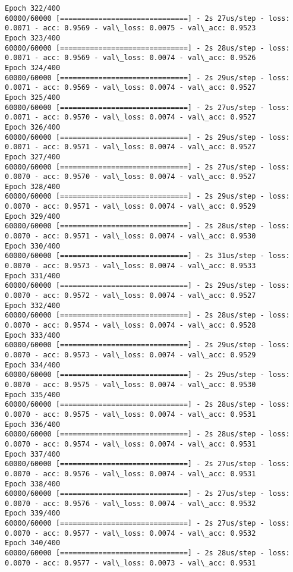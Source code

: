 \documentclass[11pt]{article}
\begin{document}
\begin{Verbatim}[commandchars=\\\{\}]
Epoch 322/400
60000/60000 [==============================] - 2s 27us/step - loss: 0.0071 - acc: 0.9569 - val\_loss: 0.0075 - val\_acc: 0.9523
Epoch 323/400
60000/60000 [==============================] - 2s 28us/step - loss: 0.0071 - acc: 0.9569 - val\_loss: 0.0074 - val\_acc: 0.9526
Epoch 324/400
60000/60000 [==============================] - 2s 29us/step - loss: 0.0071 - acc: 0.9569 - val\_loss: 0.0074 - val\_acc: 0.9527
Epoch 325/400
60000/60000 [==============================] - 2s 27us/step - loss: 0.0071 - acc: 0.9570 - val\_loss: 0.0074 - val\_acc: 0.9527
Epoch 326/400
60000/60000 [==============================] - 2s 29us/step - loss: 0.0071 - acc: 0.9571 - val\_loss: 0.0074 - val\_acc: 0.9527
Epoch 327/400
60000/60000 [==============================] - 2s 27us/step - loss: 0.0070 - acc: 0.9570 - val\_loss: 0.0074 - val\_acc: 0.9527
Epoch 328/400
60000/60000 [==============================] - 2s 29us/step - loss: 0.0070 - acc: 0.9571 - val\_loss: 0.0074 - val\_acc: 0.9529
Epoch 329/400
60000/60000 [==============================] - 2s 28us/step - loss: 0.0070 - acc: 0.9571 - val\_loss: 0.0074 - val\_acc: 0.9530
Epoch 330/400
60000/60000 [==============================] - 2s 31us/step - loss: 0.0070 - acc: 0.9573 - val\_loss: 0.0074 - val\_acc: 0.9533
Epoch 331/400
60000/60000 [==============================] - 2s 29us/step - loss: 0.0070 - acc: 0.9572 - val\_loss: 0.0074 - val\_acc: 0.9527
Epoch 332/400
60000/60000 [==============================] - 2s 28us/step - loss: 0.0070 - acc: 0.9574 - val\_loss: 0.0074 - val\_acc: 0.9528
Epoch 333/400
60000/60000 [==============================] - 2s 29us/step - loss: 0.0070 - acc: 0.9573 - val\_loss: 0.0074 - val\_acc: 0.9529
Epoch 334/400
60000/60000 [==============================] - 2s 29us/step - loss: 0.0070 - acc: 0.9575 - val\_loss: 0.0074 - val\_acc: 0.9530
Epoch 335/400
60000/60000 [==============================] - 2s 28us/step - loss: 0.0070 - acc: 0.9575 - val\_loss: 0.0074 - val\_acc: 0.9531
Epoch 336/400
60000/60000 [==============================] - 2s 28us/step - loss: 0.0070 - acc: 0.9574 - val\_loss: 0.0074 - val\_acc: 0.9531
Epoch 337/400
60000/60000 [==============================] - 2s 27us/step - loss: 0.0070 - acc: 0.9576 - val\_loss: 0.0074 - val\_acc: 0.9531
Epoch 338/400
60000/60000 [==============================] - 2s 27us/step - loss: 0.0070 - acc: 0.9576 - val\_loss: 0.0074 - val\_acc: 0.9532
Epoch 339/400
60000/60000 [==============================] - 2s 27us/step - loss: 0.0070 - acc: 0.9577 - val\_loss: 0.0074 - val\_acc: 0.9532
Epoch 340/400
60000/60000 [==============================] - 2s 28us/step - loss: 0.0070 - acc: 0.9577 - val\_loss: 0.0073 - val\_acc: 0.9531

\end{Verbatim}
\end{document}
